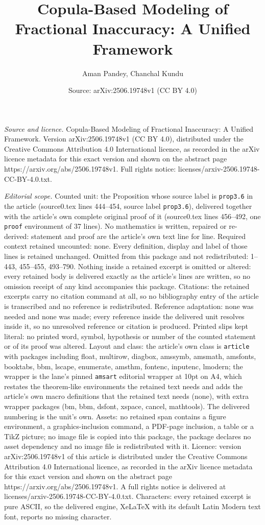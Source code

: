 \documentclass[10pt,a4paper]{amsart}
\title[Copula-Based Modeling of Fractional Inaccuracy: A Unified Fr]{Copula-Based Modeling of Fractional Inaccuracy: A Unified Framework}
\author{Aman Pandey, Chanchal Kundu}
\date{Source: arXiv:2506.19748v1 (CC BY 4.0)}
\begin{document}
\maketitle

\noindent\emph{Source and licence.} Copula-Based Modeling of Fractional Inaccuracy: A Unified Framework. Version arXiv:2506.19748v1 (CC BY 4.0), distributed under the Creative Commons Attribution 4.0 International licence, as recorded in the arXiv licence metadata for this exact version and shown on the abstract page https://arxiv.org/abs/2506.19748v1. Full rights notice: licenses/arxiv-2506.19748-CC-BY-4.0.txt.\par\smallskip

\noindent\textit{Editorial scope.} Counted unit: the Proposition whose source label is \texttt{prop3.6} in the article (source0.tex lines 444--454, source label \texttt{prop3.6}), delivered together with the article's own complete original proof of it (source0.tex lines 456--492, one \texttt{proof} environment of 37 lines). No mathematics is written, repaired or re-derived: statement and proof are the article's own text line for line. Required context retained uncounted: none. Every definition, display and label of those lines is retained unchanged. Omitted from this package and not redistributed: 1--443, 455--455, 493--790. Nothing inside a retained excerpt is omitted or altered: every retained body is delivered exactly as the article's lines are written, so no omission receipt of any kind accompanies this package. Citations: the retained excerpts carry no citation command at all, so no bibliography entry of the article is transcribed and no reference is redistributed. Reference adaptation: none was needed and none was made; every reference inside the delivered unit resolves inside it, so no unresolved reference or citation is produced. Printed slips kept literal: no printed word, symbol, hypothesis or number of the counted statement or of its proof was altered. Layout and class: the article's own class is \texttt{article} with packages including float, multirow, diagbox, amssymb, amsmath, amsfonts, booktabs, bbm, lscape, enumerate, amsthm, fontenc, inputenc, lmodern; the wrapper is the lane's pinned \texttt{amsart} editorial wrapper at 10pt on A4, which restates the theorem-like environments the retained text needs and adds the article's own macro definitions that the retained text needs (none), with extra wrapper packages (bm, bbm, dsfont, xspace, cancel, mathtools). The delivered numbering is the unit's own. Assets: no retained span contains a figure environment, a graphics-inclusion command, a PDF-page inclusion, a table or a TikZ picture; no image file is copied into this package, the package declares no asset dependency and no image file is redistributed with it. Licence: version arXiv:2506.19748v1 of this article is distributed under the Creative Commons Attribution 4.0 International licence, as recorded in the arXiv licence metadata for this exact version and shown on the abstract page https://arxiv.org/abs/2506.19748v1. A full rights notice is delivered at licenses/arxiv-2506.19748-CC-BY-4.0.txt. Characters: every retained excerpt is pure ASCII, so the delivered engine, XeLaTeX with its default Latin Modern text font, reports no missing character.
\end{document}
